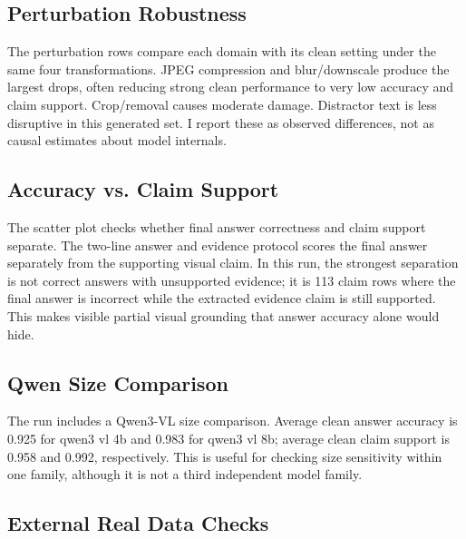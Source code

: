 \documentclass{article}
\begin{document}
\subsection{Perturbation Robustness}

The perturbation rows compare each domain with its clean setting under the same four transformations. JPEG compression and blur/downscale produce the largest drops, often reducing strong clean performance to very low accuracy and claim support. Crop/removal causes moderate damage. Distractor text is less disruptive in this generated set. I report these as observed differences, not as causal estimates about model internals.

\subsection{Accuracy vs. Claim Support}

The scatter plot checks whether final answer correctness and claim support separate. The two-line answer and evidence protocol scores the final answer separately from the supporting visual claim. In this run, the strongest separation is not correct answers with unsupported evidence; it is 113 claim rows where the final answer is incorrect while the extracted evidence claim is still supported. This makes visible partial visual grounding that answer accuracy alone would hide.

\subsection{Qwen Size Comparison}

The run includes a Qwen3-VL size comparison. Average clean answer accuracy is 0.925 for qwen3 vl 4b and 0.983 for qwen3 vl 8b; average clean claim support is 0.958 and 0.992, respectively. This is useful for checking size sensitivity within one family, although it is not a third independent model family.

\subsection{External Real Data Checks}
\end{document}
